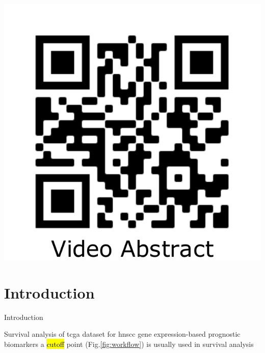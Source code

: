 \documentclass[paperwidth=78cm,paperheight=110cm,portrait]{baposter}
\begin{document}
\begin{poster}
{  \includegraphics[height=0.45\headerheight]{QRcode_VideoAbstract_JPM-1309345.pdf}
}



\section{Introduction}


\begin{posterbox}[name=intro,column=0,row=0]{Introduction}


\begin{outline}
    \1 Survival analysis of \acrfull{tcga} dataset for \acrfull{hnscc}
        \2 gene expression-based prognostic biomarkers
        \2 a \hl{cutoff} point (Fig.\ref{fig:workflow}) is usually used in survival analysis


\end{outline}
\end{posterbox}
\end{poster}
\end{document}
